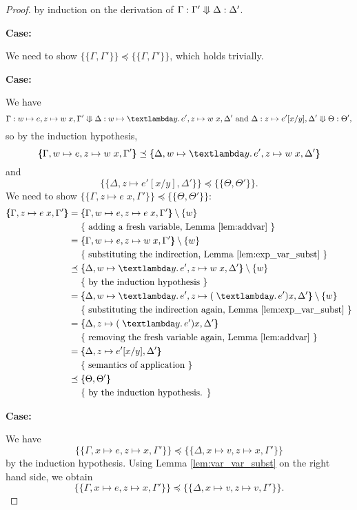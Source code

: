 \documentclass{jfp1}
\theoremstyle{nonumberbreak}
\newtheorem{proof}{Proof}
\newcommand{\sApp}[2]{#1\;#2}
\newcommand{\sLam}[2]{\text{\textlambda} #1.\, #2}
\newcommand{\ssred}[4]{#1 : #2 \mathrel{\rotatebox[origin=c]{90}{$\Lleftarrow$}} #3 : #4}
\newcommand{\sRule}[1]{\text{{\textsc{#1}}}}
\newcommand{\esem}[1]{\{\!\!\!\{#1\}\!\!\!\}}
\newcommand{\case}[1]{\par\smallskip\noindent\textbf{Case:} #1\nopagebreak\par\noindent\ignorespaces}
\newcommand{\aexpl}[1]{&\mathrel{\phantom{=}}\left\{\text{ #1 }\right\}}
\begin{document}
\begin{proof}
by induction on the derivation of $\ssred \Gamma {\Gamma'} {\Delta} {\Delta'}$.

\case{\sRule{Lam}}
We need to show $\esem{\Gamma, \Gamma'} \preceq \esem{\Gamma, \Gamma'}$, which holds trivially.

\case{\sRule{App}}
We have
\[
\ssred{\Gamma}{w \mapsto e, z \mapsto \sApp w x, \Gamma'}{\Delta}{w \mapsto \sLam y e', z \mapsto \sApp w x, \Delta'}
\text{ and }
\ssred{\Delta}{z \mapsto e'[x/y], \Delta'}{\Theta}{\Theta'},
\]
so by the induction hypothesis,
\[
\esem{\Gamma, w \mapsto e, z \mapsto \sApp w x, \Gamma'} \preceq \esem{\Delta, w \mapsto \sLam y e', z \mapsto \sApp w x, \Delta'}
\]
and
\[
\esem{\Delta,z \mapsto e'[x/y], \Delta'} \preceq \esem{\Theta,\Theta'}.
\]
We need to show $\esem{\Gamma, z \mapsto \sApp e x, \Gamma'} \preceq \esem{\Theta,\Theta'}$:
\begin{align*}
\esem{\Gamma, z \mapsto \sApp e x, \Gamma'} &= \esem{\Gamma, w \mapsto e, z\mapsto \sApp e x, \Gamma'} \setminus \{w\} \\
\aexpl{adding a fresh variable, Lemma \ref{lem:addvar}} \\
&= \esem{\Gamma, w \mapsto e, z \mapsto \sApp w x, \Gamma'} \setminus \{w\} \\
\aexpl{substituting the indirection, Lemma \ref{lem:exp_var_subst}} \\
&\preceq \esem{\Delta, w \mapsto \sLam y e', z \mapsto \sApp w x, \Delta'} \setminus \{w\}\\
\aexpl{by the induction hypothesis} \\
&= \esem{\Delta, w \mapsto \sLam y e', z \mapsto \sApp (\sLam y e') x, \Delta'} \setminus \{w\} \\
\aexpl{substituting the indirection again, Lemma \ref{lem:exp_var_subst}} \\
&= \esem{\Delta, z \mapsto \sApp (\sLam y e') x, \Delta'}\\
\aexpl{removing the fresh variable again, Lemma \ref{lem:addvar}} \\
&= \esem{\Delta, z \mapsto e'[x/y], \Delta'} \\
\aexpl{semantics of application} \\
&\preceq \esem{\Theta,\Theta'}\\
\aexpl{by the induction hypothesis.}
\end{align*}

\case{\sRule{Var}}
We have 
\[
\esem{\Gamma, x \mapsto e, z\mapsto x, \Gamma'} \preceq \esem{\Delta, x \mapsto v, z\mapsto x, \Gamma'}
\]
by the induction hypothesis. Using Lemma \ref{lem:var_var_subst} on the right hand side, we obtain
\[
\esem{\Gamma, x\mapsto e,z \mapsto x, \Gamma'} \preceq \esem{\Delta, x \mapsto v, z \mapsto v, \Gamma'}.
\]


\end{proof}
\end{document}
